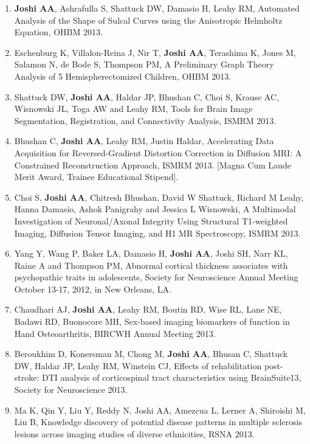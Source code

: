 \documentclass[overlapped,line,letterpaper]{res}
\begin{document}
\begin{resume}
\begin{enumerate}
    \item \textbf{Joshi AA}, Ashrafulla S, Shattuck DW, Damasio H, Leahy RM, {Automated Analysis of the Shape of Sulcal Curves using the Anisotropic Helmholtz Equation}, OHBM 2013.

    \item Eschenburg K, Villalon-Reina J, Nir T, \textbf{Joshi AA}, Terashima K, Jones M, Salamon N, de Bode S, Thompson PM, {A Preliminary Graph Theory Analysis of 5 Hemispherectomized Children}, OHBM 2013.

    \item Shattuck DW, \textbf{Joshi AA}, Haldar JP, Bhushan C, Choi S, Krause AC, Wisnowski JL, Toga AW and Leahy RM, {Tools for Brain Image Segmentation, Registration, and Connectivity Analysis}, ISMRM 2013. 

    \item Bhushan C, \textbf{Joshi AA}, Leahy RM, Justin Haldar, Accelerating Data Acquisition for Reversed-Gradient Distortion Correction in Diffusion MRI: A Constrained Reconstruction Approach, ISMRM 2013. [Magna Cum Laude Merit Award, Trainee Educational Stipend].

    \item Choi S, \textbf{Joshi AA}, Chitresh Bhushan, David W Shattuck, Richard M Leahy, Hanna Damasio, Ashok Panigrahy and Jessica L Wisnowski, A Multimodal Investigation of Neuronal/Axonal Integrity Using Structural T1-weighted Imaging, Diffusion Tensor Imaging, and H1 MR Spectroscopy, ISMRM 2013.

    \item Yang Y, Wang P, Baker LA, Damasio H, \textbf{Joshi AA}, Joshi SH, Narr KL, Raine A and Thompson PM, {Abnormal cortical thickness associates with psychopathic traits in adolescents}, Society for Neuroscience Annual Meeting October 13-17, 2012, in New Orleans, LA.

    \item Chaudhari AJ, \textbf{Joshi AA}, Leahy RM, Boutin RD, Wise RL, Lane NE, Badawi RD, Buonocore MH, {Sex-based imaging biomarkers of function in Hand Osteoarthritis}, BIRCWH Annual Meeting 2013.

    \item Beroukhim D, Konersman M, Chong M, \textbf{Joshi AA}, Bhusan C, Shattuck DW, Haldar JP, Leahy RM, Winstein CJ, {Effects of rehabilitation post-stroke: DTI analysis of corticospinal tract characteristics using BrainSuite13}, Society for Neuroscience 2013.

    \item Ma K, Qin Y, Liu Y, Reddy N, {Joshi AA}, Amezcua L, Lerner A, Shiroishi M, Liu B, {Knowledge discovery of potential disease patterns in multiple sclerosis lesions across imaging studies of diverse ethnicities}, RSNA 2013.


\end{enumerate}
\end{resume}
\end{document}
